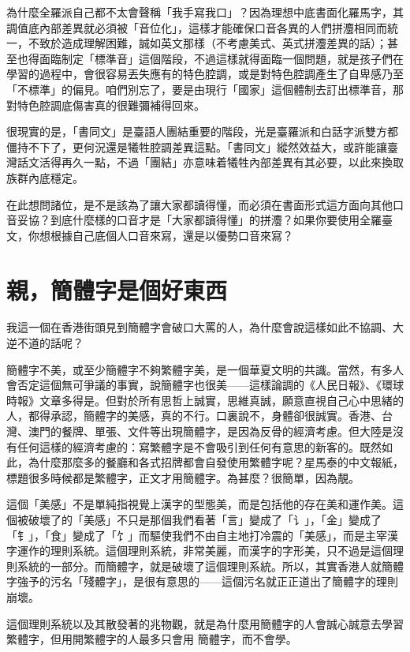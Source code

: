 \documentclass[a5paper, 10pt, openany]{book} %
\begin{document}
為什麼全羅派自己都不太會聲稱「我手寫我口」？因為理想中底書面化羅馬字，其調值底內部差異就必須被「音位化」，這樣才能確保口音各異的人們拼灋相同而統一，不致於造成理解困難，誠如英文那樣（不考慮美式、英式拼灋差異的話）；甚至也得面臨制定「標準音」這個階段，不過這樣就得面臨一個問題，就是孩子們在學習的過程中，會很容易丟失應有的特色腔調，或是對特色腔調產生了自卑感乃至「不標準」的偏見。咱們別忘了，要是由現行「國家」這個體制去訂出標準音，那對特色腔調底傷害真的很難彌補得回來。

很現實的是，「書同文」是臺語人團結重要的階段，光是臺羅派和白話字派雙方都僵持不下了，更何況還是犧牲腔調差異這點。「書同文」縱然效益大，或許能讓臺灣話文活得再久一點，不過「團結」亦意味着犧牲內部差異有其必要，以此來換取族群內底穩定。

在此想問諸位，是不是該為了讓大家都讀得懂，而必須在書面形式這方面向其他口音妥協？到底什麼樣的口音才是「大家都讀得懂」的拼灋？如果你要使用全羅臺文，你想根據自己底個人口音來寫，還是以優勢口音來寫？

\chapter{親，簡體字是個好東西}

我這一個在香港街頭見到簡體字會破口大罵的人，為什麼會說這樣如此不協調、大逆不道的話呢？

簡體字不美，或至少簡體字不夠繁體字美，是一個華夏文明的共識。當然，有多人會否定這個無可爭議的事實，說簡體字也很美——這樣論調的《人民日報》、《環球時報》文章多得是。但對於所有思哲上誠實，思維真誠，願意直視自己心中思緒的人，都得承認，簡體字的美感，真的不行。口裏說不，身體卻很誠實。香港、台灣、澳門的餐牌、單張、文件等出現簡體字，是因為反骨的經濟考慮。但大陸是沒有任何這樣的經濟考慮的：寫繁體字是不會吸引到任何有意思的新客的。既然如此，為什麼那麼多的餐廳和各式招牌都會自發使用繁體字呢？星馬泰的中文報紙，標題很多時候都是繁體字，正文才用簡體字。為甚麼？很簡單，因為靚。

這個「美感」不是單純指視覺上漢字的型態美，而是包括他的存在美和運作美。這個被破壞了的「美感」不只是那個我們看著「言」變成了「讠」，「金」變成了「钅」，「食」變成了「饣」而驅使我們不由自主地打冷震的「美感」，而是主宰漢字運作的理則系統。這個理則系統，非常美麗，而漢字的字形美，只不過是這個理則系統的一部分。而簡體字，就是破壞了這個理則系統。所以，其實香港人就簡體字強予的污名「殘體字」，是很有意思的——這個污名就正正道出了簡體字的理則崩壞。

這個理則系統以及其散發著的兆物觀，就是為什麼用簡體字的人會誠心誠意去學習繁體字，但用開繁體字的人最多只會用 簡體字，而不會學。
\end{document}
